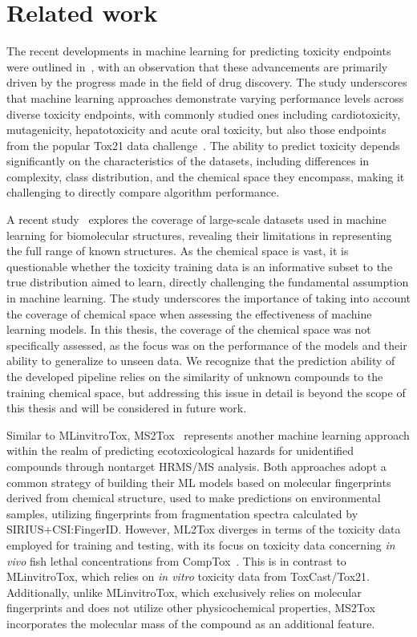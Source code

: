 \chapter{Related work}\label{chap:related_work}

The recent developments in machine learning for predicting toxicity endpoints were outlined in~\cite{cavasotto2022}, with an observation that these advancements are primarily driven by the progress made in the field of drug discovery. The study underscores that machine learning approaches demonstrate varying performance levels across diverse toxicity endpoints, with commonly studied ones including cardiotoxicity, mutagenicity, hepatotoxicity and acute oral toxicity, but also those endpoints from the popular Tox21 data challenge~\cite{richard2021}. The ability to predict toxicity depends significantly on the characteristics of the datasets, including differences in complexity, class distribution, and the chemical space they encompass, making it challenging to directly compare algorithm performance.

A recent study~\cite{kretschmer2023} explores the coverage of large-scale datasets used in machine learning for biomolecular structures, revealing their limitations in representing the full range of known structures. As the chemical space is vast, it is questionable whether the toxicity training data is an informative subset to the true distribution aimed to learn, directly challenging the fundamental assumption in machine learning. The study underscores the importance of taking into account the coverage of chemical space when assessing the effectiveness of machine learning models. In this thesis, the coverage of the chemical space was not specifically assessed, as the focus was on the performance of the models and their ability to generalize to unseen data. We recognize that the prediction ability of the developed pipeline relies on the similarity of unknown compounds to the training chemical space, but addressing this issue in detail is beyond the scope of this thesis and will be considered in future work.

Similar to MLinvitroTox, MS2Tox~\cite{peets2022} represents another machine learning approach within the realm of predicting ecotoxicological hazards for unidentified compounds through nontarget HRMS/MS analysis. Both approaches adopt a common strategy of building their ML models based on molecular fingerprints derived from chemical structure, used to make predictions on environmental samples, utilizing fingerprints from fragmentation spectra calculated by SIRIUS+CSI:FingerID. However, ML2Tox diverges in terms of the toxicity data employed for training and testing, with its focus on toxicity data concerning \emph{in vivo} fish lethal concentrations from CompTox~\cite{williams2017}. This is in contrast to MLinvitroTox, which relies on \emph{in vitro} toxicity data from ToxCast/Tox21. Additionally, unlike MLinvitroTox, which exclusively relies on molecular fingerprints and does not utilize other physicochemical properties, MS2Tox incorporates the molecular mass of the compound as an additional feature.


